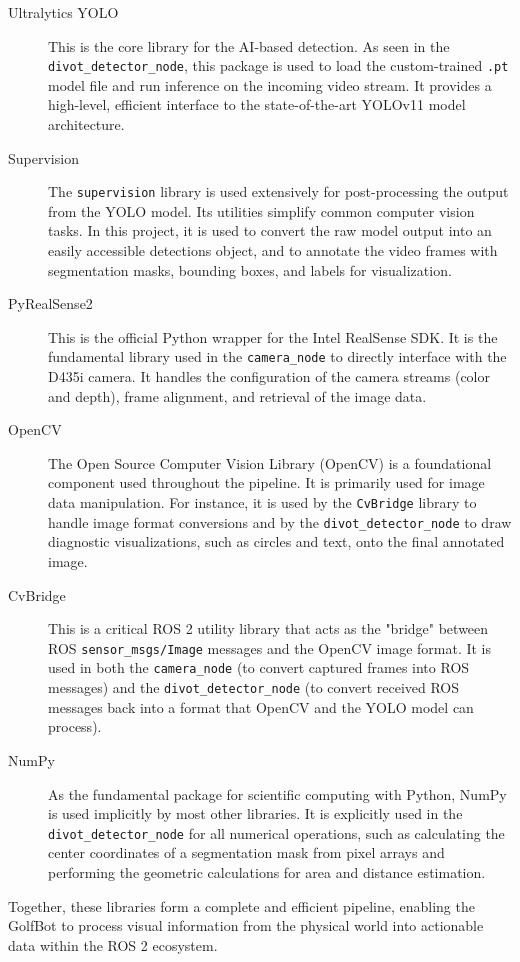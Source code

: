 \begin{description}
    \item[Ultralytics YOLO] This is the core library for the AI-based detection. As seen in the \texttt{divot\_detector\_node}, this package is used to load the custom-trained \texttt{.pt} model file and run inference on the incoming video stream. It provides a high-level, efficient interface to the state-of-the-art YOLOv11 model architecture.

    \item[Supervision] The \texttt{supervision} library is used extensively for post-processing the output from the YOLO model. Its utilities simplify common computer vision tasks. In this project, it is used to convert the raw model output into an easily accessible detections object, and to annotate the video frames with segmentation masks, bounding boxes, and labels for visualization.

    \item[PyRealSense2] This is the official Python wrapper for the Intel RealSense SDK. It is the fundamental library used in the \texttt{camera\_node} to directly interface with the D435i camera. It handles the configuration of the camera streams (color and depth), frame alignment, and retrieval of the image data.

    \item[OpenCV] The Open Source Computer Vision Library (OpenCV) is a foundational component used throughout the pipeline. It is primarily used for image data manipulation. For instance, it is used by the \texttt{CvBridge} library to handle image format conversions and by the \texttt{divot\_detector\_node} to draw diagnostic visualizations, such as circles and text, onto the final annotated image.

    \item[CvBridge] This is a critical ROS 2 utility library that acts as the "bridge" between ROS \texttt{sensor\_msgs/Image} messages and the OpenCV image format. It is used in both the \texttt{camera\_node} (to convert captured frames into ROS messages) and the \texttt{divot\_detector\_node} (to convert received ROS messages back into a format that OpenCV and the YOLO model can process).

    \item[NumPy] As the fundamental package for scientific computing with Python, NumPy is used implicitly by most other libraries. It is explicitly used in the \texttt{divot\_detector\_node} for all numerical operations, such as calculating the center coordinates of a segmentation mask from pixel arrays and performing the geometric calculations for area and distance estimation.
\end{description}
Together, these libraries form a complete and efficient pipeline, enabling the GolfBot to process visual information from the physical world into actionable data within the ROS 2 ecosystem.

